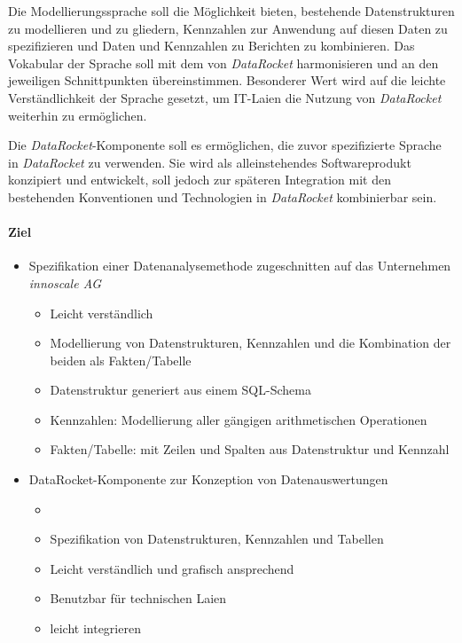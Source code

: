 \documentclass[
  language=german, %
  type=bachelor%
]{isthesis}
\begin{document}
\begin{content}
  Die Modellierungssprache soll die Möglichkeit bieten, bestehende
  Datenstrukturen zu modellieren und zu gliedern, Kennzahlen zur
  Anwendung auf diesen Daten zu spezifizieren und Daten und Kennzahlen zu
  Berichten zu kombinieren. Das Vokabular der Sprache soll mit dem von
  \textit{DataRocket} harmonisieren und an den jeweiligen Schnittpunkten
  übereinstimmen. Besonderer Wert wird auf die leichte Verständlichkeit der
  Sprache gesetzt, um IT-Laien die Nutzung von \textit{DataRocket} weiterhin zu
  ermöglichen. 
  
  Die \textit{DataRocket}-Komponente soll es ermöglichen, die zuvor
  spezifizierte Sprache in \textit{DataRocket} zu verwenden. Sie wird als
  alleinstehendes Softwareprodukt konzipiert und entwickelt, soll jedoch zur
  späteren Integration mit den bestehenden Konventionen und Technologien in
  \textit{DataRocket} kombinierbar sein.


  \paragraph{Ziel}
  \begin{itemize}
    \item Spezifikation einer Datenanalysemethode zugeschnitten auf das
      Unternehmen \textit{innoscale AG}
      \begin{itemize}
        \item Leicht verständlich
        \item Modellierung von Datenstrukturen, Kennzahlen und die Kombination der
          beiden als Fakten/Tabelle
        \item Datenstruktur generiert aus einem SQL-Schema
        \item Kennzahlen: Modellierung aller gängigen arithmetischen Operationen
        \item Fakten/Tabelle: mit Zeilen und Spalten aus Datenstruktur und Kennzahl 
      \end{itemize}
    \item DataRocket-Komponente zur Konzeption von Datenauswertungen
      \begin{itemize}
        \item {}
        \item Spezifikation von Datenstrukturen, Kennzahlen und Tabellen
        \item Leicht verständlich und grafisch ansprechend
        \item Benutzbar für technischen Laien
        \item leicht integrieren
      \end{itemize}
  \end{itemize}


\end{content}
\end{document}
